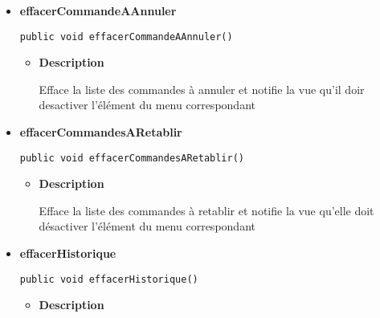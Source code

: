 \documentclass[11pt,a4paper]{report}
\begin{document}
{{{{{{\begin{itemize}
{\begin{itemize}
{Ajoute un observateur de la commande rétablir
}
\item{
{\bf  Parameters}
  \begin{itemize}
   \item{
\texttt{obs} -- L'objet observateur}
  \end{itemize}
}%
\end{itemize}
}%
\item{ 
\hypertarget{controleur.ControleurDonnees.effacerCommandeAAnnuler()}{{\bf  effacerCommandeAAnnuler}\\}
\begin{lstlisting}[frame=none]
public void effacerCommandeAAnnuler()\end{lstlisting} %
\begin{itemize}
\item{
{\bf  Description}

Efface la liste des commandes à annuler et notifie la vue qu'il doir desactiver l'élément du menu correspondant
}
\end{itemize}
}%
\item{ 
\hypertarget{controleur.ControleurDonnees.effacerCommandesARetablir()}{{\bf  effacerCommandesARetablir}\\}
\begin{lstlisting}[frame=none]
public void effacerCommandesARetablir()\end{lstlisting} %
\begin{itemize}
\item{
{\bf  Description}

Efface la liste des commandes à retablir et notifie la vue qu'elle doit désactiver l'élément du menu correspondant
}
\end{itemize}
}%
\item{ 
\hypertarget{controleur.ControleurDonnees.effacerHistorique()}{{\bf  effacerHistorique}\\}
\begin{lstlisting}[frame=none]
public void effacerHistorique()\end{lstlisting} %
\begin{itemize}
\item{
{\bf  Description}

}
\end{itemize}}
\end{itemize}}}}}}}
\end{document}
